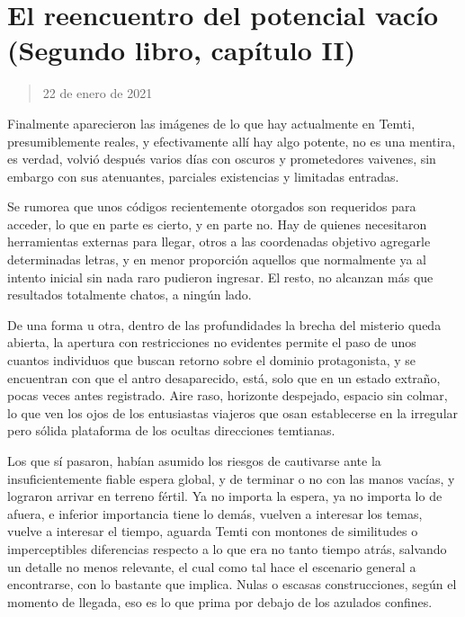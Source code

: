 \documentclass[
]{book}
\begin{document}
\hypertarget{el-reencuentro-del-potencial-vacuxedo-segundo-libro-capuxedtulo-ii}{%
\section{El reencuentro del potencial vacío (Segundo libro, capítulo II)}\label{el-reencuentro-del-potencial-vacuxedo-segundo-libro-capuxedtulo-ii}}

\begin{quote}
22 de enero de 2021
\end{quote}

Finalmente aparecieron las imágenes de lo que hay actualmente en Temti, presumiblemente reales, y efectivamente allí hay algo potente, no es una mentira, es verdad, volvió después varios días con oscuros y prometedores vaivenes, sin embargo con sus atenuantes, parciales existencias y limitadas entradas.

Se rumorea que unos códigos recientemente otorgados son requeridos para acceder, lo que en parte es cierto, y en parte no. Hay de quienes necesitaron herramientas externas para llegar, otros a las coordenadas objetivo agregarle determinadas letras, y en menor proporción aquellos que normalmente ya al intento inicial sin nada raro pudieron ingresar. El resto, no alcanzan más que resultados totalmente chatos, a ningún lado.

De una forma u otra, dentro de las profundidades la brecha del misterio queda abierta, la apertura con restricciones no evidentes permite el paso de unos cuantos individuos que buscan retorno sobre el dominio protagonista, y se encuentran con que el antro desaparecido, está, solo que en un estado extraño, pocas veces antes registrado. Aire raso, horizonte despejado, espacio sin colmar, lo que ven los ojos de los entusiastas viajeros que osan establecerse en la irregular pero sólida plataforma de los ocultas direcciones temtianas.

Los que sí pasaron, habían asumido los riesgos de cautivarse ante la insuficientemente fiable espera global, y de terminar o no con las manos vacías, y lograron arrivar en terreno fértil. Ya no importa la espera, ya no importa lo de afuera, e inferior importancia tiene lo demás, vuelven a interesar los temas, vuelve a interesar el tiempo, aguarda Temti con montones de similitudes o imperceptibles diferencias respecto a lo que era no tanto tiempo atrás, salvando un detalle no menos relevante, el cual como tal hace el escenario general a encontrarse, con lo bastante que implica. Nulas o escasas construcciones, según el momento de llegada, eso es lo que prima por debajo de los azulados confines.
\end{document}
